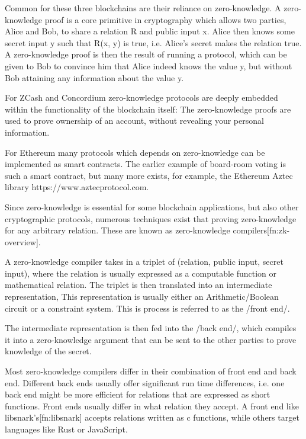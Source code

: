 Common for these three blockchains are their reliance on zero-knowledge.
A zero-knowledge proof is a core primitive in cryptography which
allows two parties, Alice and Bob, to share a relation R and public input x.
Alice then knows some secret input y such that R(x, y) is true, i.e. Alice's
secret makes the relation true.
A zero-knowledge proof is then the result of running a protocol, which can be
given to Bob to convince him that Alice indeed knows the value y, but without Bob
attaining any information about the value y.

For ZCash and Concordium zero-knowledge protocols are deeply embedded within the
functionality of the blockchain itself: The zero-knowledge proofs are used to
prove ownership of an account, without revealing your personal information.

For Ethereum many protocols which depends on zero-knowledge can be implemented
as smart contracts.
The earlier example of board-room voting is such a smart contract, but many more
exists, for example, the Ethereum Aztec library https://www.aztecprotocol.com.

\vspace{3mm}

Since zero-knowledge is essential for some blockchain applications, but also
other cryptographic protocols,
numerous techniques exist that proving zero-knowledge for
any arbitrary relation. These are known as
zero-knowledge compilers[fn:zk-overview].

A zero-knowledge compiler takes in a triplet of (relation, public input, secret
input), where the relation is usually expressed as a computable function or
mathematical relation.
The triplet is then translated into an intermediate representation,
This representation is usually either an Arithmetic/Boolean circuit or a constraint system.
This is process is referred to as the /front end/.

The intermediate representation is then fed into the /back end/, which compiles it
into a zero-knowledge argument that can be sent to the other parties to prove
knowledge of the secret.

Most zero-knowledge compilers differ in their combination of front end and back end.
Different back ends usually offer significant run time differences, i.e. one back
end might be more efficient for relations that are expressed as short functions.
Front ends usually differ in what relation they accept. A front end like
libsnark's[fn:libsnark] accepts relations written as c functions, while others
target languages like Rust or JavaScript.


